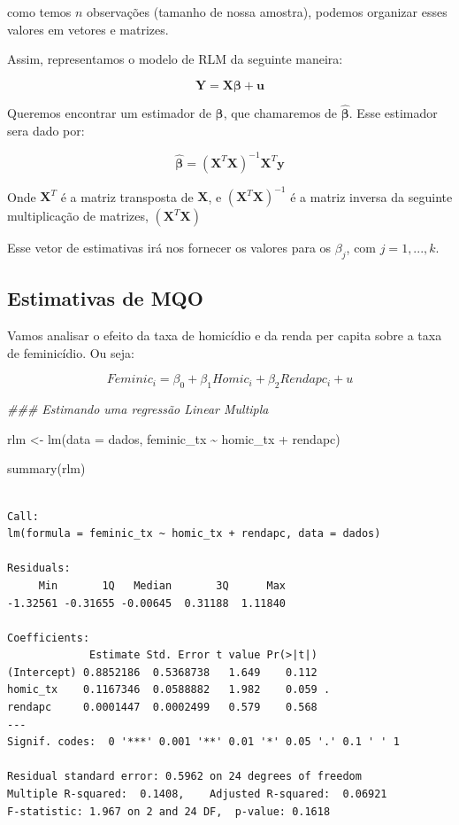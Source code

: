 \documentclass[
  letterpaper,
  DIV=11,
  numbers=noendperiod]{scrreprt}
\newenvironment{Shaded}{\begin{snugshade}}{\end{snugshade}}
\newcommand{\AttributeTok}[1]{\textcolor[rgb]{0.40,0.45,0.13}{#1}}
\newcommand{\DocumentationTok}[1]{\textcolor[rgb]{0.37,0.37,0.37}{\textit{#1}}}
\newcommand{\FunctionTok}[1]{\textcolor[rgb]{0.28,0.35,0.67}{#1}}
\newcommand{\NormalTok}[1]{\textcolor[rgb]{0.00,0.23,0.31}{#1}}
\newcommand{\OtherTok}[1]{\textcolor[rgb]{0.00,0.23,0.31}{#1}}
\newcommand{\SpecialCharTok}[1]{\textcolor[rgb]{0.37,0.37,0.37}{#1}}
\begin{document}
como temos \(n\) observações (tamanho de nossa amostra), podemos
organizar esses valores em vetores e matrizes.

Assim, representamos o modelo de RLM da seguinte maneira:

\[\mathbf{Y} = \mathbf{X} \boldsymbol{\beta} + \mathbf{u}\]

Queremos encontrar um estimador de \(\boldsymbol{\beta}\), que
chamaremos de \(\boldsymbol{\hat{\beta}}\). Esse estimador sera dado
por:

\[\hat{\boldsymbol{\beta}} = (\mathbf{X}^T \mathbf{X})^{-1} \mathbf{X}^T \mathbf{y}\]

Onde \(\mathbf{X}^T\) é a matriz transposta de \(\mathbf{X}\), e
\((\mathbf{X}^T \mathbf{X})^{-1}\) é a matriz inversa da seguinte
multiplicação de matrizes, \((\mathbf{X}^T \mathbf{X})\)

Esse vetor de estimativas irá nos fornecer os valores para os
\(\beta_j\), com \(j=1,...,k\).

\subsection{Estimativas de MQO}\label{estimativas-de-mqo}

Vamos analisar o efeito da taxa de homicídio e da renda per capita sobre
a taxa de feminicídio. Ou seja:

\[Feminic_i = \beta_0 + \beta_1 Homic_{i} + \beta_{2} Rendapc_i  + u\]

\begin{Shaded}
\begin{Highlighting}[]
\DocumentationTok{\#\#\# Estimando uma regressão Linear Multipla}

\NormalTok{rlm }\OtherTok{\textless{}{-}} \FunctionTok{lm}\NormalTok{(}\AttributeTok{data =}\NormalTok{ dados, feminic\_tx }\SpecialCharTok{\textasciitilde{}}\NormalTok{ homic\_tx }\SpecialCharTok{+}\NormalTok{ rendapc)}

\FunctionTok{summary}\NormalTok{(rlm)}
\end{Highlighting}
\end{Shaded}

\begin{verbatim}

Call:
lm(formula = feminic_tx ~ homic_tx + rendapc, data = dados)

Residuals:
     Min       1Q   Median       3Q      Max 
-1.32561 -0.31655 -0.00645  0.31188  1.11840 

Coefficients:
             Estimate Std. Error t value Pr(>|t|)  
(Intercept) 0.8852186  0.5368738   1.649    0.112  
homic_tx    0.1167346  0.0588882   1.982    0.059 .
rendapc     0.0001447  0.0002499   0.579    0.568  
---
Signif. codes:  0 '***' 0.001 '**' 0.01 '*' 0.05 '.' 0.1 ' ' 1

Residual standard error: 0.5962 on 24 degrees of freedom
Multiple R-squared:  0.1408,    Adjusted R-squared:  0.06921 
F-statistic: 1.967 on 2 and 24 DF,  p-value: 0.1618
\end{verbatim}
\end{document}
